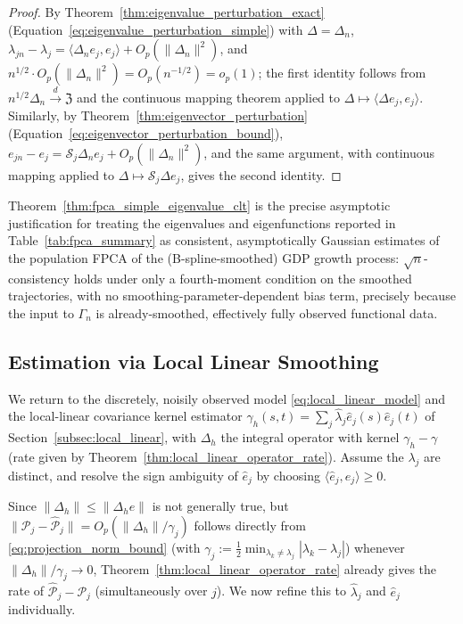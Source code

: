 \begin{proof}
By Theorem~\ref{thm:eigenvalue_perturbation_exact}
(Equation~\eqref{eq:eigenvalue_perturbation_simple}) with $\Delta=\Delta_n$,
$\lambda_{jn}-\lambda_j = \langle\Delta_ne_j,e_j\rangle+O_p(\|\Delta_n\|^2)$,
and $n^{1/2}\cdot O_p(\|\Delta_n\|^2)=O_p(n^{-1/2})=o_p(1)$; the first
identity follows from $n^{1/2}\Delta_n\xrightarrow{d}\mathfrak{Z}$ and the
continuous mapping theorem applied to $\Delta\mapsto\langle\Delta e_j,
e_j\rangle$. Similarly, by Theorem~\ref{thm:eigenvector_perturbation}
(Equation~\eqref{eq:eigenvector_perturbation_bound}), $e_{jn}-e_j =
\mathcal{S}_j\Delta_ne_j+O_p(\|\Delta_n\|^2)$, and the same argument, with
continuous mapping applied to $\Delta\mapsto\mathcal{S}_j\Delta e_j$, gives
the second identity.
\end{proof}

Theorem~\ref{thm:fpca_simple_eigenvalue_clt} is the precise asymptotic
justification for treating the eigenvalues and eigenfunctions reported in
Table~\ref{tab:fpca_summary} as consistent, asymptotically Gaussian
estimates of the population FPCA of the (B-spline-smoothed) GDP growth
process: $\sqrt{n}$-consistency holds under only a fourth-moment condition
on the smoothed trajectories, with no smoothing-parameter-dependent bias
term, precisely because the input to $\Gamma_n$ is already-smoothed,
effectively fully observed functional data.

\subsection{Estimation via Local Linear Smoothing}
\label{subsec:fpca_local_linear}

We return to the discretely, noisily observed model
\eqref{eq:local_linear_model} and the local-linear covariance kernel
estimator $\gamma_h(s,t)=\sum_j\widehat\lambda_j\widehat{e}_j(s)\widehat{e}
_j(t)$ of Section~\ref{subsec:local_linear}, with $\Delta_h$ the integral
operator with kernel $\gamma_h-\gamma$ (rate given by
Theorem~\ref{thm:local_linear_operator_rate}). Assume the $\lambda_j$ are
distinct, and resolve the sign ambiguity of $\widehat{e}_j$ by choosing
$\langle\widehat{e}_j,e_j\rangle\geq0$.

Since $\|\Delta_h\|\leq\|\Delta_he\|$ is not generally true, but
$\|\mathcal{P}_j-\widehat{\mathcal{P}}_j\| = O_p(\|\Delta_h\|/\gamma_j)$
follows directly from \eqref{eq:projection_norm_bound} (with $\gamma_j:=
\frac12\min_{\lambda_k\neq\lambda_j}|\lambda_k-\lambda_j|$) whenever
$\|\Delta_h\|/\gamma_j\to0$, Theorem~\ref{thm:local_linear_operator_rate}
already gives the rate of $\widehat{\mathcal{P}}_j-\mathcal{P}_j$
(simultaneously over $j$). We now refine this to $\widehat\lambda_j$ and
$\widehat{e}_j$ individually.

